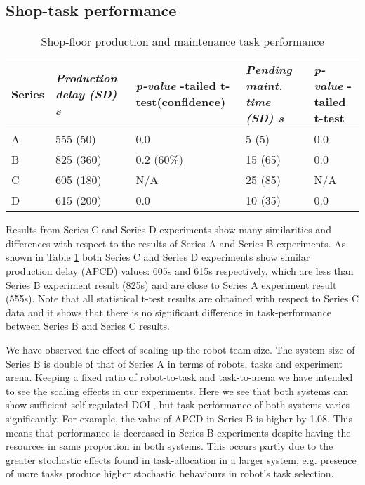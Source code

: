 \documentclass[journal]{IEEEtran}
\begin{document}
\subsection{Shop-task performance}
\begin{table}
\begin{small}
\begin{center}
\caption{Shop-floor production and maintenance task performance}
\begin{tabular}{|p{0.22in}|p{0.5in}|p{0.6in}|p{0.4in}|p{0.4in}|}
\hline Series & \textit{Production \protect\newline delay \protect\newline (SD) s} & \textit{p-value} \protect\newline 1-tailed t-test\protect\newline (confidence) & \textit{Pending \protect\newline maint. time \protect\newline (SD) s} & \textit{p-value} \protect\newline 1-tailed \protect\newline t-test\\ 
\hline A & 555 (50) & 0.0 & 5 (5) & 0.0\\ 
\hline B & 825 (360) & 0.2 (60\%) & 15 (65) & 0.0 \\
\hline C & 605 (180) & N/A & 25 (85) & N/A\\
\hline D  & 615 (200) & 0.0 & 10 (35) & 0.0\\
\hline
\end{tabular}
\label{table:vsp-cmp} 
\end{center}
\end{small}
\end{table}
Results from Series C and Series D experiments show many similarities and differences with respect to the results of Series A and Series B experiments. As shown in Table \ref{table:vsp-cmp}  both Series C and Series D experiments show similar production delay (APCD) values: 605s and 615s respectively, which are less than Series B experiment result (825s) and are close to Series A experiment result (555s). Note that all statistical t-test results are obtained with respect to Series C data and it shows that there is no significant difference in task-performance between Series B and Series C results.

We have observed the effect of scaling-up the robot team size. The system size of Series B is double of that of Series A in terms of robots, tasks and experiment arena. Keeping a fixed ratio of robot-to-task and task-to-arena we have intended to see the scaling effects in our experiments. Here we see that both systems can show sufficient self-regulated DOL, but task-performance of both systems varies significantly. For example, the value of APCD in Series B is higher by 1.08. This means that performance  is decreased in Series B experiments despite having the resources in same proportion in both systems. This occurs partly due to the greater stochastic effects found in task-allocation in a larger system, e.g. presence of more tasks produce higher stochastic behaviours in robot's task selection.
\end{document}

